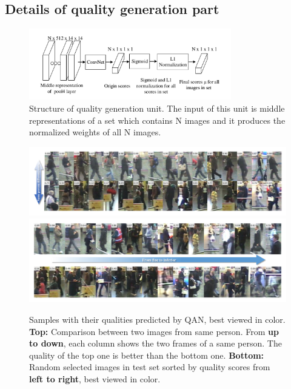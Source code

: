 \subsection{Details of quality generation part}
\label{details_qgp}

\begin{figure}[!htbp]
  \centering
  \includegraphics[height=3.1cm]{figure2.pdf}
  \caption{Structure of quality generation unit. The input of this unit is middle representations of a set which contains N images and it produces the normalized weights of all N images.}
  \label{qgu}
\label{figure2}
\end{figure}



\begin{figure}[!ht]
  \centering
  \includegraphics[width=16cm]{supp_sameperson.pdf}
  \includegraphics[width=16cm]{supp_sortbyscore.pdf}
  \caption{Samples with their qualities predicted by QAN, best viewed in color. \textbf{Top:} Comparison between two images from same person. From \textbf{up to down}, each column shows the two frames of a same person. The quality of the top one is better than the bottom one. \textbf{Bottom:} Random selected images in test set sorted by quality scores from \textbf{left to right}, best viewed in color.}
  \label{fig:samples}
\end{figure}

